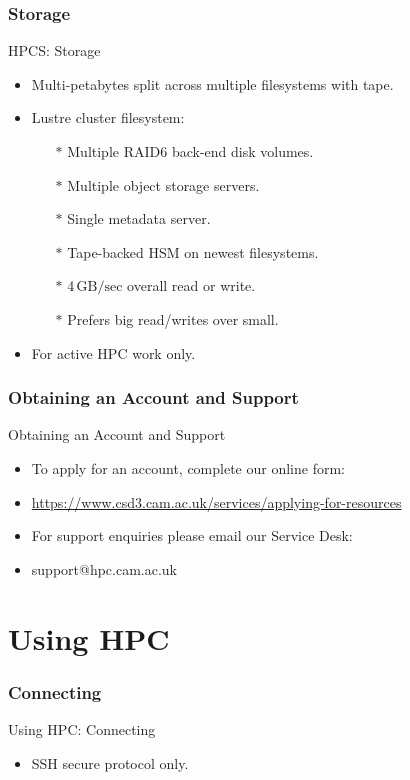 \section{Storage}
\begin{frame}{HPCS: Storage}
\begin{itemize}
\item{Multi-petabytes split across multiple filesystems with tape.}
\item{Lustre cluster filesystem:}
\begin{itemize}
\item[$\ast$]{Multiple RAID6 back-end disk volumes.}
\item[$\ast$]{Multiple object storage servers.}
\item[$\ast$]{Single metadata server.}
\item[$\ast$]{Tape-backed HSM on newest filesystems.}
\pause
\item[$\ast$]{\alert{$4\,\text{GB/sec}$ overall read or write.}}
\pause
\item[$\ast$]{\alert{Prefers big read/writes over small.}}
\end{itemize}
\pause
\item{\alert{For active HPC work only.}}
\end{itemize}
\end{frame}

\section{Obtaining an Account and Support}
\begin{frame}{Obtaining an Account and Support}
\begin{itemize}
\item{To apply for an account, complete our online form:}
\item{\url{https://www.csd3.cam.ac.uk/services/applying-for-resources}}
\pause
\item{For support enquiries please email our Service Desk:}
\item{\alert{support@hpc.cam.ac.uk}}
\end{itemize}
\end{frame}

\part{Using HPC}
\frame{\partpage}

\section{Connecting}
\begin{frame}{Using HPC: Connecting}
\begin{itemize}
\item SSH secure protocol only.\hfill\\
\end{itemize}
\end{frame}

